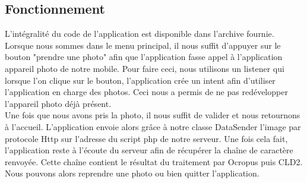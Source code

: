 \subsection{Fonctionnement}
L'intégralité du code de l'application est disponible dans l'archive fournie.\\

Lorsque nous sommes dans le menu principal, il nous suffit d'appuyer sur le bouton "prendre une photo" afin que l'application fasse appel à l'application appareil photo de notre mobile. Pour faire ceci, nous utilisons un listener qui lorsque l'on clique sur le bouton, l'application crée un intent afin d'utiliser l'application en charge des photos. Ceci nous a permis de ne pas redévelopper l'appareil photo déjà présent.\\

Une fois que nous avons pris la photo, il nous suffit de valider et nous retournons à l'accueil. L'application envoie alors grâce à notre classe DataSender l'image par protocole Http sur l'adresse du script php de notre serveur. Une fois cela fait, l'application reste à l'écoute du serveur afin de récupérer la chaîne de caractère renvoyée. Cette chaîne contient le résultat du traitement par Ocropus puis CLD2.\\

Nous pouvons alors reprendre une photo ou bien quitter l'application.


